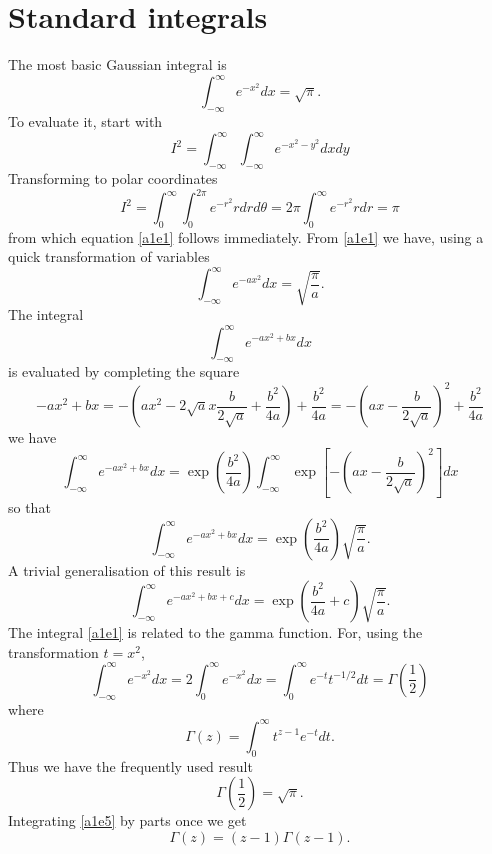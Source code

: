 \section{Standard integrals}
The most basic Gaussian integral is
\begin{equation}\label{a1e1}
\int_{-\infty}^\infty e^{-x^2}dx = \sqrt{\pi}.
\end{equation}
To evaluate it, start with 
\[
I^2 = \int_{-\infty}^\infty\int_{-\infty}^\infty e^{-x^2-y^2}dxdy
\]
Transforming to polar coordinates
\[
I^2 = \int_0^\infty\int_0^{2\pi} e^{-r^2}rdrd\theta = 
2\pi\int_0^\infty e^{-r^2}rdr = \pi
\]
from which equation \eqref{a1e1} follows immediately. From \eqref{a1e1} we 
have, using a quick transformation of variables
\begin{equation}\label{a1e2}
\int_{-\infty}^\infty e^{-ax^2}dx = \sqrt{\frac{\pi}{a}}.
\end{equation}
The integral
\[
\int_{-\infty}^\infty e^{-ax^2+bx}dx
\]
is evaluated by completing the square
\[
-ax^2+bx = -\left(ax^2 - 2\sqrt{a}x\frac{b}{2\sqrt{a}} + \frac{b^2}{4a}\right)
+ \frac{b^2}{4a} = -\left(ax - \frac{b}{2\sqrt{a}}\right)^2 + \frac{b^2}{4a}
\]
we have
\[
\int_{-\infty}^\infty e^{-ax^2+bx}dx = \exp\left(\frac{b^2}{4a}\right)
\int_{-\infty}^\infty\exp\left[-\left(ax-\frac{b}{2\sqrt{a}}\right)^2\right]dx
\]
so that
\begin{equation}\label{a1e3}
\int_{-\infty}^\infty e^{-ax^2+bx}dx = 
\exp\left(\frac{b^2}{4a}\right)\sqrt{\frac{\pi}{a}}.
\end{equation}
A trivial generalisation of this result is
\begin{equation}\label{a1e4}
\int_{-\infty}^\infty e^{-ax^2+bx+c}dx = \exp\left(\frac{b^2}{4a} + c\right)
\sqrt{\frac{\pi}{a}}.
\end{equation}
The integral \eqref{a1e1} is related to the gamma function. For, using the 
transformation $t = x^2$,
\[
\int_{-\infty}^\infty e^{-x^2}dx = 2\int_{0}^\infty e^{-x^2}dx =
\int_{0}^\infty e^{-t}t^{-1/2}dt = \Gamma\left(\frac{1}{2}\right)
\]
where
\begin{equation}\label{a1e5}
\Gamma(z) = \int_{0}^\infty t^{z-1}e^{-t}dt.
\end{equation}
Thus we have the frequently used result
\begin{equation}\label{a1e6}
\Gamma\left(\frac{1}{2}\right) = \sqrt{\pi}.
\end{equation}
Integrating \eqref{a1e5} by parts once we get
\begin{equation}\label{a1e7}
\Gamma(z) = (z - 1)\Gamma(z - 1).
\end{equation}

